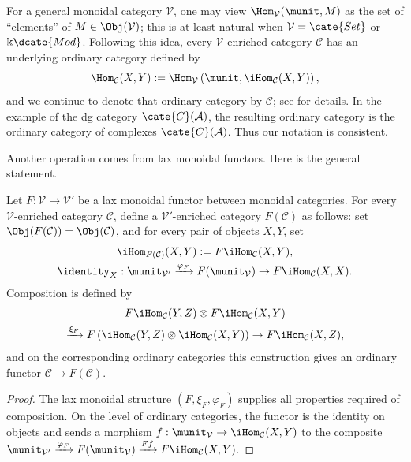 For a general monoidal category $\mathcal{V}$, one may view
$\Hom_{\mathcal{V}}(\munit,M)$ as the set of “elements” of
$M\in\Obj(\mathcal{V})$; this is at least natural when
$\mathcal{V}=\cate{Set}$ or $\Bbbk\dcate{Mod}$. Following this idea, every
$\mathcal{V}$-enriched category $\mathcal{C}$ has an underlying ordinary
category defined by
\[ \Hom_{\mathcal{C}}(X, Y) := \Hom_{\mathcal{V}}\left( \munit, \iHom_{\mathcal{C}}(X, Y) \right), \]
and we continue to denote that ordinary category by $\mathcal{C}$; see
\cite[Remark 3.4.3]{Li1} for details. In the example of the dg category
$\cate{C}(\mathcal{A})$, the resulting ordinary category is the ordinary
category of complexes $\cate{C}(\mathcal{A})$. Thus our notation is
consistent.

Another operation comes from lax monoidal functors. Here is the general
statement.

\begin{proposition}\label{prop:lax-monoidal-enriched}
	Let $F:\mathcal{V}\to\mathcal{V}'$ be a lax monoidal functor between
	monoidal categories. For every $\mathcal{V}$-enriched category
	$\mathcal{C}$, define a $\mathcal{V}'$-enriched category $F(\mathcal{C})$
	as follows: set $\Obj(F(\mathcal{C}))=\Obj(\mathcal{C})$, and for every
	pair of objects $X,Y$, set
	\begin{gather*}
		\iHom_{F(\mathcal{C})}(X, Y) := F\iHom_{\mathcal{C}}(X, Y), \\
		\identity_X: \munit_{\mathcal{V}'} \xrightarrow{\varphi_F} F(\munit_{\mathcal{V}}) \to F\iHom_{\mathcal{C}}(X, X).
	\end{gather*}
	Composition is defined by
	\begin{multline*}
		F\iHom_{\mathcal{C}}(Y, Z) \otimes F\iHom_{\mathcal{C}}(X, Y) \\
		\xrightarrow{\xi_F} F\left( \iHom_{\mathcal{C}}(Y, Z) \otimes \iHom_{\mathcal{C}}(X, Y) \right)
		\to F\iHom_{\mathcal{C}}(X, Z),
	\end{multline*}
	and on the corresponding ordinary categories this construction gives an
	ordinary functor $\mathcal{C}\to F(\mathcal{C})$.
\end{proposition}
\begin{proof}
	The lax monoidal structure $(F,\xi_F,\varphi_F)$ supplies all properties
	required of composition. On the level of ordinary categories, the functor
	is the identity on objects and sends a morphism
	$f:\munit_{\mathcal{V}}\to\iHom_{\mathcal{C}}(X,Y)$ to the composite
	$\munit_{\mathcal{V}'}\xrightarrow{\varphi_F}F(\munit_{\mathcal{V}})
	\xrightarrow{Ff}F\iHom_{\mathcal{C}}(X,Y)$.
\end{proof}

